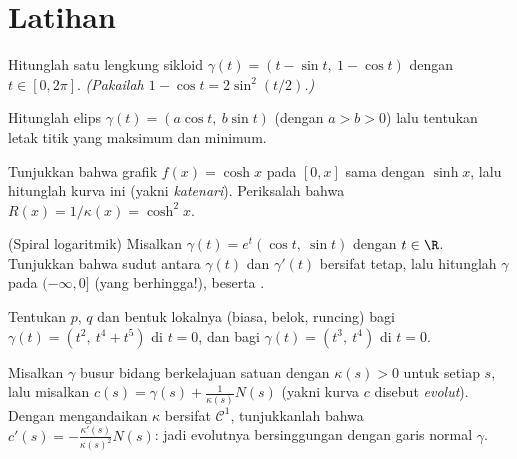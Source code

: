 \section{Latihan}

\begin{exercise}[$\star$]\label{exo:b2:curves:1}
Hitunglah  satu lengkung sikloid $\gamma(t) = (t -
\sin t,\ 1 - \cos t)$ dengan $t \in [0, 2\pi]$. \emph{(Pakailah $1 - \cos t =
2\sin^2(t/2)$.)}
\end{exercise}

\begin{exercise}[$\star$]\label{exo:b2:curves:2}
Hitunglah  elips $\gamma(t) = (a\cos t,\ b\sin
t)$ (dengan $a > b > 0$) lalu tentukan letak titik yang 
maksimum dan minimum.
\end{exercise}

\begin{exercise}[$\star$]\label{exo:b2:curves:3}
Tunjukkan bahwa  grafik $f(x) = \cosh x$ pada
$[0, x]$ sama dengan $\sinh x$, lalu hitunglah  kurva
ini (yakni \emph{katenari}). Periksalah bahwa $R(x) = 1/\kappa(x) =
\cosh^2 x$.
\end{exercise}

\begin{exercise}[$\star\star$]\label{exo:b2:curves:4}
(Spiral logaritmik) Misalkan $\gamma(t) = e^{t}(\cos t,\ \sin t)$ dengan $t
\in \R$.
Tunjukkan bahwa sudut antara $\gamma(t)$ dan $\gamma'(t)$ bersifat
tetap, lalu hitunglah  $\gamma$ pada $(-\infty, 0]$
(yang berhingga!), beserta .
\end{exercise}

\begin{exercise}[$\star\star$]\label{exo:b2:curves:5}
Tentukan $p$, $q$ dan bentuk lokalnya (biasa, belok,
runcing) bagi $\gamma(t) = (t^2,\ t^4 + t^5)$ di $t = 0$, dan bagi
$\gamma(t) = (t^3,\ t^4)$ di $t = 0$.
\end{exercise}

\begin{exercise}[$\star\star$]\label{exo:b2:curves:6}
Misalkan $\gamma$ busur bidang berkelajuan satuan dengan $\kappa(s) > 0$ untuk
setiap $s$, lalu misalkan $c(s) = \gamma(s) + \frac{1}{\kappa(s)}N(s)$
 (yakni kurva $c$ disebut \emph{evolut}).
Dengan mengandaikan $\kappa$ bersifat $\mathcal{C}^1$, tunjukkanlah bahwa $c'(s) =
-\frac{\kappa'(s)}{\kappa(s)^2}N(s)$: jadi evolutnya bersinggungan dengan
garis normal $\gamma$.
\end{exercise}

